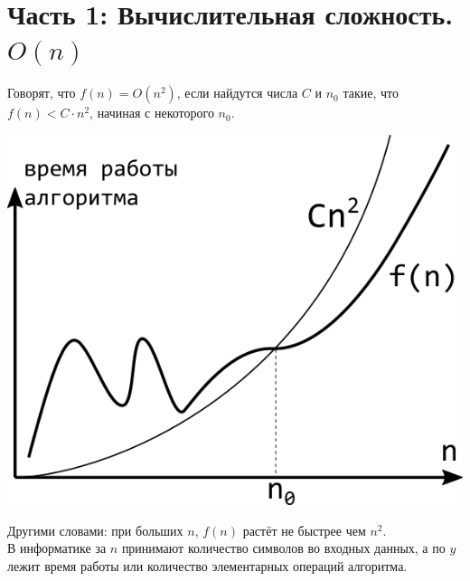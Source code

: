 \documentclass{article}
\begin{document}
\section*{Часть 1: Вычислительная сложность. $O(n)$}
Говорят, что $f(n) = O(n^2)$, если найдутся числа $C$ и $n_0$ такие, что $f(n) < C \cdot n^2$, начиная с  некоторого $n_0$.
\begin{center}
\includegraphics[scale=0.5]{../images/On.png}
\end{center}
Другими словами: при больших $n$, $f(n)$ растёт не быстрее чем $n^2$.\\
В информатике за $n$ принимают количество символов во входных данных, а по $y$ лежит время работы или количество элементарных операций алгоритма.
\end{document}
